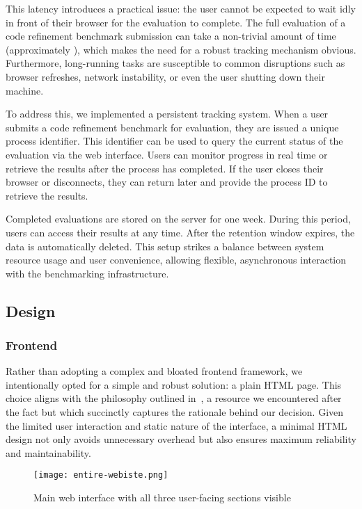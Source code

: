 This latency introduces a practical issue: the user cannot be expected to wait idly in front of
their browser for the evaluation to complete. The full evaluation of a code refinement benchmark
submission can take a non-trivial amount of time (approximately ), which makes the need for a robust tracking mechanism obvious.
Furthermore, long-running tasks are susceptible to common disruptions such as browser refreshes,
network instability, or even the user shutting down their machine.

To address this, we implemented a persistent tracking system. When a user submits a code refinement
benchmark for evaluation, they are issued a unique process identifier. This identifier can be used
to query the current status of the evaluation via the web interface. Users can monitor progress in
real time or retrieve the results after the process has completed. If the user closes their browser
or disconnects, they can return later and provide the process ID to retrieve the results.

Completed evaluations are stored on the server for one week. During this period, users can access
their results at any time. After the retention window expires, the data is automatically deleted.
This setup strikes a balance between system resource usage and user convenience, allowing flexible,
asynchronous interaction with the benchmarking infrastructure.

\subsection{Design}

\subsubsection{Frontend}
\label{sec:frontend}

Rather than adopting a complex and bloated frontend framework, we intentionally opted for a simple
and robust solution: a plain HTML page. This choice aligns with the philosophy outlined
in~\cite{justusehtml}, a resource we encountered after the fact but which succinctly captures the
rationale behind our decision. Given the limited user interaction and static nature of the
interface, a minimal HTML design not only avoids unnecessary overhead but also ensures maximum
reliability and maintainability.

\begin{figure}[H]
    \centering
    \texttt{[image: entire-webiste.png]}
    \caption{Main web interface with all three user-facing sections visible}
    \label{fig:full-page}
\end{figure}

